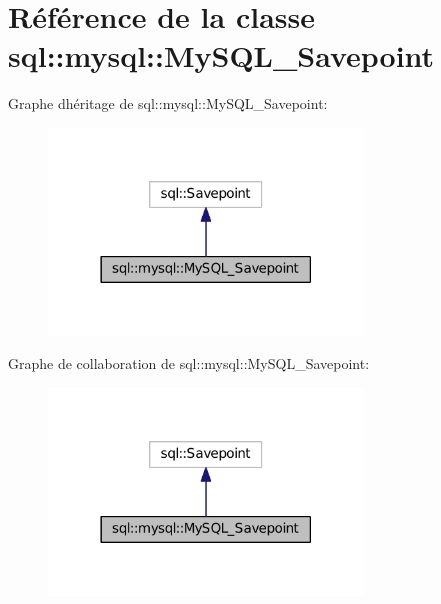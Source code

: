 \hypertarget{classsql_1_1mysql_1_1MySQL__Savepoint}{}\section{Référence de la classe sql\+:\+:mysql\+:\+:My\+S\+Q\+L\+\_\+\+Savepoint}
\label{classsql_1_1mysql_1_1MySQL__Savepoint}


Graphe d\textquotesingle{}héritage de sql\+:\+:mysql\+:\+:My\+S\+Q\+L\+\_\+\+Savepoint\+:\nopagebreak
\begin{figure}[H]
\begin{center}
\leavevmode
\includegraphics[width=237pt]{classsql_1_1mysql_1_1MySQL__Savepoint__inherit__graph}
\end{center}
\end{figure}


Graphe de collaboration de sql\+:\+:mysql\+:\+:My\+S\+Q\+L\+\_\+\+Savepoint\+:\nopagebreak
\begin{figure}[H]
\begin{center}
\leavevmode
\includegraphics[width=237pt]{classsql_1_1mysql_1_1MySQL__Savepoint__coll__graph}
\end{center}
\end{figure}
